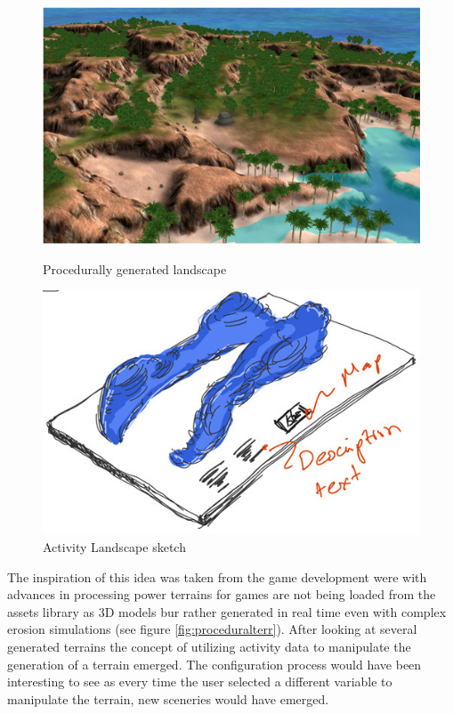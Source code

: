 \documentclass[../medieninformatik-arbeit.tex]{subfiles}
\begin{document}
\begin{figure}[h]
\centering
\begin{minipage}{.45\textwidth}
\centering
	\includegraphics[width=\linewidth]{Prototype/img/terrain}
	\caption{Procedurally generated landscape \cite{olsen2004realtime}}
	\label{fig:proceduralterr}
\end{minipage}
\begin{minipage}{.45\textwidth}
\centering
  \includegraphics[width=0.88\linewidth]{Prototype/img/ActivityLandscape_detail}
  \caption{Activity Landscape sketch}
  \label{fig:activitylandscape}
\end{minipage}
\end{figure}

The inspiration of this idea was taken from the game development were with advances in processing power terrains for games are not being loaded from the assets library as 3D models bur rather generated in real time even with complex erosion simulations\cite{olsen2004realtime} (see figure \ref{fig:proceduralterr}). After looking at several generated terrains the concept of utilizing activity data to manipulate the generation of a terrain emerged. The configuration process would have been interesting to see as every time the user selected a different variable to manipulate the terrain, new sceneries would have emerged.
\end{document}
